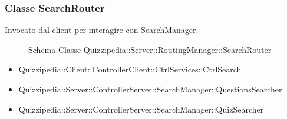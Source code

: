 \subsubsection{Classe SearchRouter}
Invocato dal client per interagire con SearchManager.
\begin{figure}[H]
\centering
\noindent{}
\caption[Schema Classe SearchRouter]{Schema Classe Quizzipedia::Server::RoutingManager::SearchRouter}
\end{figure}
\begin{itemize}
\item Quizzipedia::Client::ControllerClient::CtrlServices::CtrlSearch
\end{itemize}
\begin{itemize}
\item Quizzipedia::Server::ControllerServer::SearchManager::QuestionsSearcher
\item Quizzipedia::Server::ControllerServer::SearchManager::QuizSearcher
\end{itemize}
